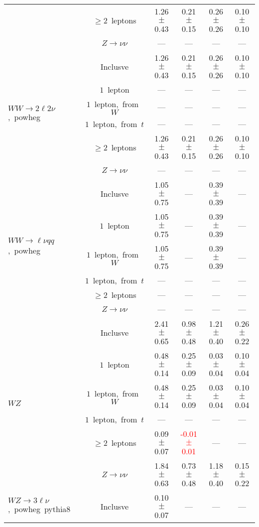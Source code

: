 \documentclass{article}
\begin{document}
\begin{longtable}{|l|c|c|c|c|c|}
 & $\ge2$~leptons  & 1.26 $\pm$ 0.43  & 0.21 $\pm$ 0.15  & 0.26 $\pm$ 0.26  & 0.10 $\pm$ 0.10 \\* 
 & $Z\rightarrow\nu\nu$  & ---  & ---  & ---  & --- \\* 
\hline 
\multirow{6}{*}{$WW{\rightarrow}2\ell2\nu$,~powheg} & Inclusve  & 1.26 $\pm$ 0.43  & 0.21 $\pm$ 0.15  & 0.26 $\pm$ 0.26  & 0.10 $\pm$ 0.10 \\* 
 & $1$~lepton  & ---  & ---  & ---  & --- \\* 
 & $1$~lepton,~from~$W$  & ---  & ---  & ---  & --- \\* 
 & $1$~lepton,~from~$t$  & ---  & ---  & ---  & --- \\* 
 & $\ge2$~leptons  & 1.26 $\pm$ 0.43  & 0.21 $\pm$ 0.15  & 0.26 $\pm$ 0.26  & 0.10 $\pm$ 0.10 \\* 
 & $Z\rightarrow\nu\nu$  & ---  & ---  & ---  & --- \\* 
\hline 
\multirow{6}{*}{$WW{\rightarrow}{\ell}{\nu}qq$,~powheg} & Inclusve  & 1.05 $\pm$ 0.75  & ---  & 0.39 $\pm$ 0.39  & --- \\* 
 & $1$~lepton  & 1.05 $\pm$ 0.75  & ---  & 0.39 $\pm$ 0.39  & --- \\* 
 & $1$~lepton,~from~$W$  & 1.05 $\pm$ 0.75  & ---  & 0.39 $\pm$ 0.39  & --- \\* 
 & $1$~lepton,~from~$t$  & ---  & ---  & ---  & --- \\* 
 & $\ge2$~leptons  & ---  & ---  & ---  & --- \\* 
 & $Z\rightarrow\nu\nu$  & ---  & ---  & ---  & --- \\* 
\hline 
\multirow{6}{*}{$WZ$} & Inclusve  & 2.41 $\pm$ 0.65  & 0.98 $\pm$ 0.48  & 1.21 $\pm$ 0.40  & 0.26 $\pm$ 0.22 \\* 
 & $1$~lepton  & 0.48 $\pm$ 0.14  & 0.25 $\pm$ 0.09  & 0.03 $\pm$ 0.04  & 0.10 $\pm$ 0.04 \\* 
 & $1$~lepton,~from~$W$  & 0.48 $\pm$ 0.14  & 0.25 $\pm$ 0.09  & 0.03 $\pm$ 0.04  & 0.10 $\pm$ 0.04 \\* 
 & $1$~lepton,~from~$t$  & ---  & ---  & ---  & --- \\* 
 & $\ge2$~leptons  & 0.09 $\pm$ 0.07  & \textcolor{red}{ -0.01 $\pm$ 0.01 }  & ---  & --- \\* 
 & $Z\rightarrow\nu\nu$  & 1.84 $\pm$ 0.63  & 0.73 $\pm$ 0.48  & 1.18 $\pm$ 0.40  & 0.15 $\pm$ 0.22 \\* 
\hline 
\multirow{6}{*}{$WZ{\rightarrow}3\ell\nu$,~powheg~pythia8} & Inclusve  & 0.10 $\pm$ 0.07  & ---  & ---  & --- \\* 

\end{longtable}
\end{document}
